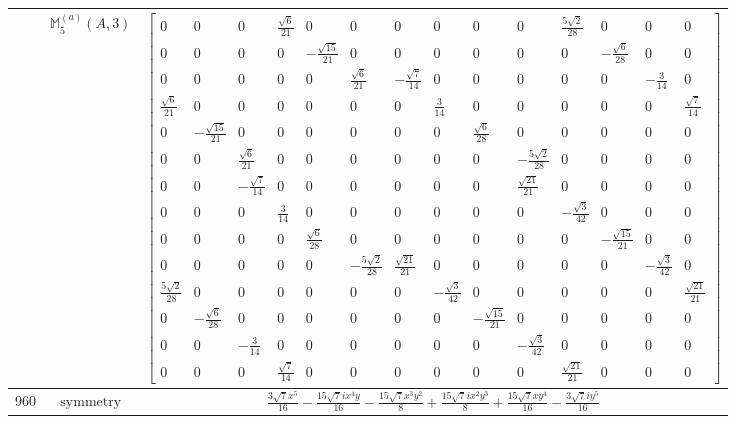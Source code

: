\documentclass[fleqn,8pt,landscape]{jsarticle}
\begin{document}
\begin{longtable}{ccc}
$  $ & $ \mathbb{M}_{5}^{(a)}(A,3) $ & $ \begin{bmatrix} 0 & 0 & 0 & \frac{\sqrt{6}}{21} & 0 & 0 & 0 & 0 & 0 & 0 & \frac{5 \sqrt{2}}{28} & 0 & 0 & 0 \\ 0 & 0 & 0 & 0 & - \frac{\sqrt{15}}{21} & 0 & 0 & 0 & 0 & 0 & 0 & - \frac{\sqrt{6}}{28} & 0 & 0 \\ 0 & 0 & 0 & 0 & 0 & \frac{\sqrt{6}}{21} & - \frac{\sqrt{7}}{14} & 0 & 0 & 0 & 0 & 0 & - \frac{3}{14} & 0 \\ \frac{\sqrt{6}}{21} & 0 & 0 & 0 & 0 & 0 & 0 & \frac{3}{14} & 0 & 0 & 0 & 0 & 0 & \frac{\sqrt{7}}{14} \\ 0 & - \frac{\sqrt{15}}{21} & 0 & 0 & 0 & 0 & 0 & 0 & \frac{\sqrt{6}}{28} & 0 & 0 & 0 & 0 & 0 \\ 0 & 0 & \frac{\sqrt{6}}{21} & 0 & 0 & 0 & 0 & 0 & 0 & - \frac{5 \sqrt{2}}{28} & 0 & 0 & 0 & 0 \\ 0 & 0 & - \frac{\sqrt{7}}{14} & 0 & 0 & 0 & 0 & 0 & 0 & \frac{\sqrt{21}}{21} & 0 & 0 & 0 & 0 \\ 0 & 0 & 0 & \frac{3}{14} & 0 & 0 & 0 & 0 & 0 & 0 & - \frac{\sqrt{3}}{42} & 0 & 0 & 0 \\ 0 & 0 & 0 & 0 & \frac{\sqrt{6}}{28} & 0 & 0 & 0 & 0 & 0 & 0 & - \frac{\sqrt{15}}{21} & 0 & 0 \\ 0 & 0 & 0 & 0 & 0 & - \frac{5 \sqrt{2}}{28} & \frac{\sqrt{21}}{21} & 0 & 0 & 0 & 0 & 0 & - \frac{\sqrt{3}}{42} & 0 \\ \frac{5 \sqrt{2}}{28} & 0 & 0 & 0 & 0 & 0 & 0 & - \frac{\sqrt{3}}{42} & 0 & 0 & 0 & 0 & 0 & \frac{\sqrt{21}}{21} \\ 0 & - \frac{\sqrt{6}}{28} & 0 & 0 & 0 & 0 & 0 & 0 & - \frac{\sqrt{15}}{21} & 0 & 0 & 0 & 0 & 0 \\ 0 & 0 & - \frac{3}{14} & 0 & 0 & 0 & 0 & 0 & 0 & - \frac{\sqrt{3}}{42} & 0 & 0 & 0 & 0 \\ 0 & 0 & 0 & \frac{\sqrt{7}}{14} & 0 & 0 & 0 & 0 & 0 & 0 & \frac{\sqrt{21}}{21} & 0 & 0 & 0 \end{bmatrix} $ \\ \hline
$ 960 $ & $ \text{symmetry} $ & $ \frac{3 \sqrt{7} x^{5}}{16} - \frac{15 \sqrt{7} i x^{4} y}{16} - \frac{15 \sqrt{7} x^{3} y^{2}}{8} + \frac{15 \sqrt{7} i x^{2} y^{3}}{8} + \frac{15 \sqrt{7} x y^{4}}{16} - \frac{3 \sqrt{7} i y^{5}}{16} $ \\

\end{longtable}
\end{document}
